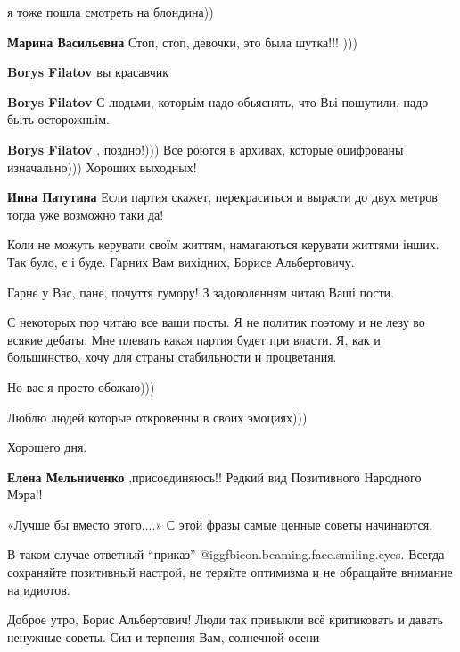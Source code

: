 \begin{itemize}
\begin{itemize}
я тоже пошла смотреть на блондина))


\textbf{Марина Васильевна} Стоп, стоп, девочки, это была шутка!!!
)))

\textbf{Borys Filatov} вы красавчик

\textbf{Borys Filatov} С людьми, которьім надо обьяснять, что Вьі пошутили, надо бьіть осторожньім.

\textbf{Borys Filatov} , поздно!)))
Все роются в архивах, которые оцифрованы изначально)))
Хороших выходных!

\textbf{Инна Патутина} Если партия скажет, перекраситься и вырасти до двух метров тогда уже возможно таки да!
\end{itemize} %


Коли не можуть керувати своїм життям, намагаються керувати життями інших.
Так було, є і буде.
Гарних Вам вихідних, Борисе Альбертовичу.

Гарне у Вас, пане, почуття гумору! З задоволенням читаю Ваші пости.


С некоторых пор читаю все ваши посты. Я не политик поэтому и не лезу во всякие
дебаты. Мне плевать какая партия будет при власти. Я, как и большинство, хочу
для страны стабильности и процветания.

Но вас я просто обожаю)))

Люблю людей которые откровенны в своих эмоциях)))

Хорошего дня.

\begin{itemize} %
\textbf{Елена Мельниченко} ,присоединяюсь!! Редкий вид Позитивного Народного Мэра!!
\end{itemize} %

«Лучше бы вместо этого....» С этой фразы самые ценные советы начинаются.


В таком случае ответный \enquote{приказ} @igg{fbicon.beaming.face.smiling.eyes}. 
Всегда сохраняйте позитивный настрой, не теряйте оптимизма и не обращайте внимание на идиотов.


Доброе утро, Борис Альбертович! Люди так привыкли всё критиковать и давать
ненужные советы. Сил и терпения Вам, солнечной осени


\end{itemize}
